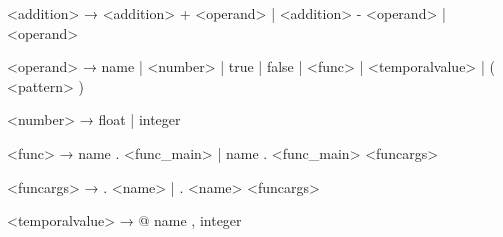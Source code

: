      <addition> → <addition> + <operand>
                 | <addition> - <operand>
                 | <operand>

       <operand> → name
                 | <number>
                 | true
                 | false
                 | <func>
                 | <temporalvalue>
                 | ( <pattern> )

        <number> → float
                 | integer

          <func> → name . <func\_main>
                 | name . <func\_main> <funcargs>

      <funcargs> → . <name>
                 | . <name> <funcargs>

 <temporalvalue> → @ { name , integer }
